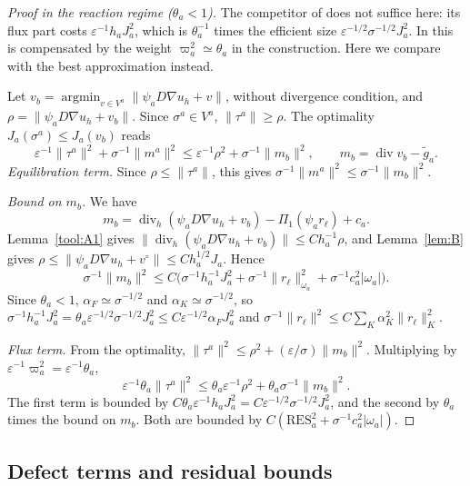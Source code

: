 \documentclass[11pt]{article}
\newcommand{\eps}{\varepsilon}
\newcommand{\dv}{\operatorname{div}}
\theoremstyle{plain}
\theoremstyle{remark}
\numberwithin{equation}{section}
\begin{document}
\begin{proof}[Proof in the reaction regime ($\theta_a<1$)]
The competitor of \cite{SV20} does not suffice here: its flux part costs $\eps^{-1}h_aJ_a^2$, which
is $\theta_a^{-1}$ times the efficient size $\eps^{-1/2}\sigma^{-1/2}J_a^2$. In \cite{SV20} this is
compensated by the weight $\varpi_a^2\simeq\theta_a$ in the construction. Here we compare with the
best approximation instead.

Let $v_b=\operatorname*{argmin}_{v\in V^a}\|\psi_aD\nabla u_h+v\|$, without divergence condition, and
$\rho=\|\psi_aD\nabla u_h+v_b\|$. Since $\sigma^a\in V^a$, $\|\tau^a\|\ge\rho$. The optimality
$J_a(\sigma^a)\le J_a(v_b)$ reads
\[
  \eps^{-1}\|\tau^a\|^2+\sigma^{-1}\|m^a\|^2\le\eps^{-1}\rho^2+\sigma^{-1}\|m_b\|^2,
  \qquad m_b=\dv v_b-\tilde g_a.
\]
\emph{Equilibration term.} Since $\rho\le\|\tau^a\|$, this gives
$\sigma^{-1}\|m^a\|^2\le\sigma^{-1}\|m_b\|^2$.

\emph{Bound on $m_b$.} We have
\[
  m_b=\dv_h(\psi_aD\nabla u_h+v_b)-\Pi_1(\psi_ar_\ell)+c_a.
\]
Lemma~\ref{tool:A1} gives
$\|\dv_h(\psi_aD\nabla u_h+v_b)\|\le Ch_a^{-1}\rho$, and Lemma~\ref{lem:B} gives
$\rho\le\|\psi_aD\nabla u_h+v^\circ\|\le Ch_a^{1/2}J_a$. Hence
\[
  \sigma^{-1}\|m_b\|^2\le C\bigl(\sigma^{-1}h_a^{-1}J_a^2+\sigma^{-1}\|r_\ell\|_{\omega_a}^2
  +\sigma^{-1}c_a^2|\omega_a|\bigr).
\]
Since $\theta_a<1$, $\alpha_F\simeq\sigma^{-1/2}$ and $\alpha_K\simeq\sigma^{-1/2}$, so
$\sigma^{-1}h_a^{-1}J_a^2=\theta_a\eps^{-1/2}\sigma^{-1/2}J_a^2\le C\eps^{-1/2}\alpha_FJ_a^2$ and
$\sigma^{-1}\|r_\ell\|^2\le C\sum_K\alpha_K^2\|r_\ell\|_K^2$.

\emph{Flux term.} From the optimality, $\|\tau^a\|^2\le\rho^2+(\eps/\sigma)\|m_b\|^2$. Multiplying by
$\eps^{-1}\varpi_a^2=\eps^{-1}\theta_a$,
\[
  \eps^{-1}\theta_a\|\tau^a\|^2\le\theta_a\eps^{-1}\rho^2+\theta_a\sigma^{-1}\|m_b\|^2.
\]
The first term is bounded by $C\theta_a\eps^{-1}h_aJ_a^2=C\eps^{-1/2}\sigma^{-1/2}J_a^2$, and the
second by $\theta_a$ times the bound on $m_b$. Both are bounded by
$C(\mathrm{RES}_a^2+\sigma^{-1}c_a^2|\omega_a|)$.
\end{proof}

\subsection{Defect terms and residual bounds}
\end{document}
